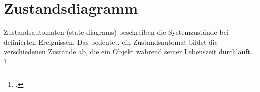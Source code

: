 \documentclass{lehramt-informatik}
\begin{document}

\chapter{Zustandsdiagramm}

\begin{quellen}
\item \cite[Seite 329-400]{rupp}
\item \cite{net:pdf:zustandsdiagramm}
\end{quellen}

\noindent
Zustandsautomaten (state diagrams) beschreiben die Systemzustände bei
definierten Ereignissen. Das bedeutet, ein Zustandsautomat bildet die
verschiedenen Zustände ab, die ein Objekt während seiner Lebenszeit
durchläuft.
\footcite[Seite 166]{schatten}
\end{document}
